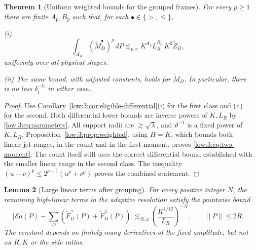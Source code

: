 \documentclass[11pt]{amsart}
\newtheorem{theorem}{Theorem}[section]
\newtheorem{lemma}[theorem]{Lemma}
\theoremstyle{definition}
\theoremstyle{remark}
\newcommand{\norm}[1]{\lVert #1\rVert}
\newcommand{\abs}[1]{\lvert #1\rvert}
\numberwithin{equation}{section}
\begin{document}
\begin{theorem}[Uniform weighted bounds for the grouped frames]\label{low:3:thm:two-regimes}
For every $p\geq1$ there are finite $A_p,B_p$ such that, for each $\bullet\in\{>,\leq\}$,

\noindent\textup{(i)} \begin{equation}\label{low:3:eq:two-moment} \int_{\mathcal A_R}(\widetilde M_D^\bullet)^p\,dP\lesssim_{p,a} K^{A_p}L_R^{B_p}\,K^3\widetilde Z_D, \end{equation} uniformly over all physical shapes.

\noindent\textup{(ii)} The same bound, with adjusted constants, holds for $\widetilde M_D$. In particular, there is no loss $\delta_i^{-b_i}$ in either case.
\end{theorem}

\begin{proof}
Use Corollary~\ref{low:3:cor:eligible-differential}(i) for the first class and (ii) for the second. Both differential lower bounds are inverse powers of $K,L_R$ by \eqref{low:3:eq:parameters}. All support radii are $\gtrsim\sqrt\lambda$, and $\vartheta^{-1}$ is a fixed power of $K,L_R$. Proposition~\ref{low:3:prop:weighted}, using $H=K$, which bounds both linear-jet ranges, in the count and in the first moment, proves \eqref{low:3:eq:two-moment}. The count itself still uses the correct differential bound established with the smaller linear range in the second class. The inequality $(u+v)^p\leq2^{p-1}(u^p+v^p)$ proves the combined statement.
\end{proof}

\begin{lemma}[Large linear terms after grouping]\label{low:3:lem:tail}
For every positive integer $N$, the remaining high-linear terms in the adaptive resolution satisfy the pointwise bound
\begin{equation}\label{low:3:eq:tail}
\abs{\mathcal E a(P)-\sum_D(\widetilde F_D^>(P)+\widetilde F_D^{\leq}(P))}\lesssim_{N,a} \left(\frac{K^{1/12}}{L_R}\right)^{-N},\qquad \norm P\leq2R.
\end{equation}
The constant depends on finitely many derivatives of the fixed amplitude, but not on $R,K$ or the side ratios.
\end{lemma}
\end{document}
